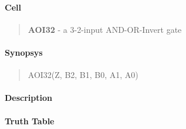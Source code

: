 \label{AOI32}
\paragraph{Cell}
\begin{quote}
    \textbf{AOI32} - a 3-2-input AND-OR-Invert gate
\end{quote}

\paragraph{Synopsys}
\begin{quote}
    AOI32(Z, B2, B1, B0, A1, A0)
\end{quote}

\paragraph{Description}



\paragraph{Truth Table}


